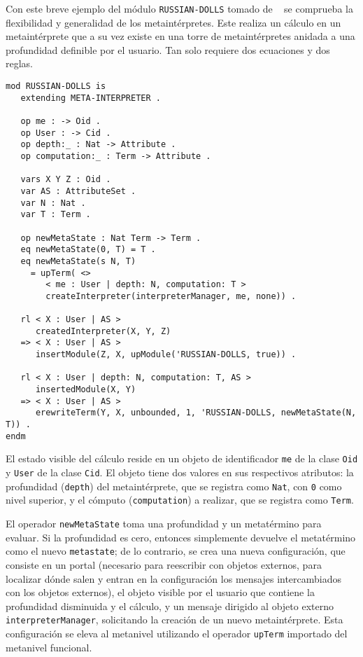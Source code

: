 Con este breve ejemplo del módulo \texttt{RUSSIAN-DOLLS} tomado de ~\citet{maude30} se comprueba la flexibilidad y generalidad de los metaintérpretes. Este realiza un cálculo en un metaintérprete que a su vez existe en una torre de metaintérpretes anidada a una profundidad definible por el usuario. Tan solo requiere dos ecuaciones y dos reglas.
 
\begin{lstlisting}[language=Maude,caption={Módulo \texttt{RUSSIAN-DOLLS}},label=lst:Russian]
 mod RUSSIAN-DOLLS is
   extending META-INTERPRETER .
   
   op me : -> Oid .
   op User : -> Cid .
   op depth:_ : Nat -> Attribute .
   op computation:_ : Term -> Attribute .

   vars X Y Z : Oid .
   var AS : AttributeSet .
   var N : Nat .
   var T : Term .

   op newMetaState : Nat Term -> Term .
   eq newMetaState(0, T) = T .
   eq newMetaState(s N, T)
     = upTerm( <>
        < me : User | depth: N, computation: T >
        createInterpreter(interpreterManager, me, none)) .

   rl < X : User | AS >
      createdInterpreter(X, Y, Z)
   => < X : User | AS >
      insertModule(Z, X, upModule('RUSSIAN-DOLLS, true)) .

   rl < X : User | depth: N, computation: T, AS >
      insertedModule(X, Y)
   => < X : User | AS >
      erewriteTerm(Y, X, unbounded, 1, 'RUSSIAN-DOLLS, newMetaState(N, T)) .
endm
\end{lstlisting}

El estado visible del cálculo reside en un objeto de identificador \texttt{me} de la clase \texttt{Oid} y \texttt{User} de la clase \texttt{Cid}. El objeto tiene dos valores en sus respectivos atributos: la profundidad (\texttt{depth}) del metaintérprete, que se registra como \texttt{Nat}, con \texttt{0} como nivel superior, y el cómputo (\texttt{computation}) a realizar, que se registra como \texttt{Term}.
\smallskip

El operador \texttt{newMetaState} toma una profundidad y un metatérmino para evaluar. Si la profundidad es cero, entonces simplemente devuelve el metatérmino como el nuevo \texttt{metastate}; de lo contrario, se crea una nueva configuración, que consiste en un portal (necesario para reescribir con objetos externos, para localizar dónde salen y entran en la configuración los mensajes intercambiados con los objetos externos), el objeto visible por el usuario que contiene la profundidad disminuida y el cálculo, y un mensaje dirigido al objeto externo \texttt{interpreterManager}, solicitando la creación de un nuevo metaintérprete.
Esta configuración se eleva al metanivel utilizando el operador \texttt{upTerm} importado del metanivel funcional.
\smallskip

